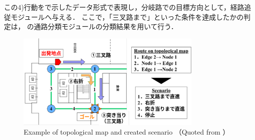 この4)行動をで示したデータ形式で表現し，分岐路での目標方向として，経路追従モジュールへ与える．
ここで，「三叉路まで」といった条件を達成したかの判定は，
の通路分類モジュールの分類結果を用いて行う．
\vspace{3zh}
\begin{figure}[htbp]
    \centering
     \includegraphics[width=90mm]{images/pdf/topo2sce.pdf}
     \caption{Example of topological map and created scenario （Quoted from \cite{haruyama2023}）}
     \label{fig:topo2sce}
\end{figure}